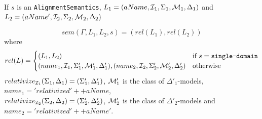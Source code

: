 \documentclass[10pt,fleqn,final]{scrreprt}
\newcommand*{\syntax}[1]{\texttt{#1}}
\newenvironment{definitions}[0]{\medskip }{}
\begin{document}
\begin{definitions}
If $s$ is an \syntax{AlignmentSemantics},
$L_1 = (aName, {\cal I}_1,\Sigma_1,{\cal M}_1,\Delta_1)$
and
$L_2 = (aName', {\cal I}_2,\Sigma_2,{\cal M}_2,\Delta_2)$

$$sem(\Gamma, L_1, L_2, s) = (rel(L_1), rel(L_2))$$
\noindent where $$ rel(L) = \begin{cases}
                                   (L_1,L_2) & \mbox{if } s = \syntax{single-domain}\\
                                   (name_1,\cI_1,\Sigma'_1,\cM'_1,\Delta'_1),
                                   (name_2,\cI_2,\Sigma'_2,\cM'_2,\Delta'_2)& \mbox{otherwise}
                                                                                                                  \end{cases}$$
                                                                                                                  \noindent
$relativize_{{\cal I}_1}(\Sigma_1,\Delta_1) = (\Sigma'_1,\Delta'_1)$,
${\cal M}'_1$ is the class of $\Delta'_1$-models,
$name_1 = 'relativized' ++ aName$,\\
$relativize_{{\cal I}_2}(\Sigma_2,\Delta_2) = (\Sigma'_2,\Delta'_2)$,
${\cal M}'_2$ is the class of $\Delta'_2$-models and
$name_2 = 'relativized'++aName'$.
                                                                                                                   

\end{definitions}
\end{document}
